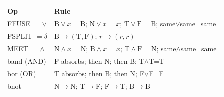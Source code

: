 \begin{longtable}[]{@{}ll@{}}
\toprule
\begin{minipage}[b]{0.47\columnwidth}\raggedright
Op\strut
\end{minipage} & \begin{minipage}[b]{0.47\columnwidth}\raggedright
Rule\strut
\end{minipage}\tabularnewline
\midrule
\endhead
\begin{minipage}[t]{0.47\columnwidth}\raggedright
FFUSE \(= \vee\)\strut
\end{minipage} & \begin{minipage}[t]{0.47\columnwidth}\raggedright
\(\mathrm{B}\vee x=\mathrm{B}\); \(\mathrm{N}\vee x=x\);
\(\mathrm{T}\vee\mathrm{F}=\mathrm{B}\); same\(\vee\)same=same\strut
\end{minipage}\tabularnewline
\begin{minipage}[t]{0.47\columnwidth}\raggedright
FSPLIT \(= \delta\)\strut
\end{minipage} & \begin{minipage}[t]{0.47\columnwidth}\raggedright
\(\mathrm{B}\to(\mathrm{T},\mathrm{F})\); \(r\to(r,r)\)\strut
\end{minipage}\tabularnewline
\begin{minipage}[t]{0.47\columnwidth}\raggedright
MEET \(= \wedge\)\strut
\end{minipage} & \begin{minipage}[t]{0.47\columnwidth}\raggedright
\(\mathrm{N}\wedge x=\mathrm{N}\); \(\mathrm{B}\wedge x=x\);
\(\mathrm{T}\wedge\mathrm{F}=\mathrm{N}\); same\(\wedge\)same=same\strut
\end{minipage}\tabularnewline
\begin{minipage}[t]{0.47\columnwidth}\raggedright
band (AND)\strut
\end{minipage} & \begin{minipage}[t]{0.47\columnwidth}\raggedright
F absorbs; then N; then B; T\(\wedge\)T=T\strut
\end{minipage}\tabularnewline
\begin{minipage}[t]{0.47\columnwidth}\raggedright
bor (OR)\strut
\end{minipage} & \begin{minipage}[t]{0.47\columnwidth}\raggedright
T absorbs; then B; then N; F\(\vee\)F=F\strut
\end{minipage}\tabularnewline
\begin{minipage}[t]{0.47\columnwidth}\raggedright
bnot\strut
\end{minipage} & \begin{minipage}[t]{0.47\columnwidth}\raggedright
N\(\to\)N; T\(\to\)F; F\(\to\)T; B\(\to\)B\strut
\end{minipage}\tabularnewline
\bottomrule
\end{longtable}

